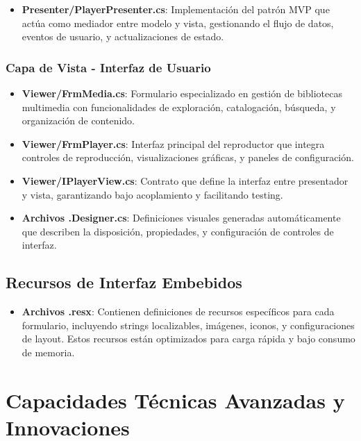 \documentclass[a4paper]{article}
\begin{document}
\begin{itemize}
\item \textbf{Presenter/PlayerPresenter.cs}: Implementación del patrón MVP que actúa como mediador entre modelo y vista, gestionando el flujo de datos, eventos de usuario, y actualizaciones de estado.
\end{itemize}

\subsubsection{Capa de Vista - Interfaz de Usuario}

\begin{itemize}
\item \textbf{Viewer/FrmMedia.cs}: Formulario especializado en gestión de bibliotecas multimedia con funcionalidades de exploración, catalogación, búsqueda, y organización de contenido.

\item \textbf{Viewer/FrmPlayer.cs}: Interfaz principal del reproductor que integra controles de reproducción, visualizaciones gráficas, y paneles de configuración.

\item \textbf{Viewer/IPlayerView.cs}: Contrato que define la interfaz entre presentador y vista, garantizando bajo acoplamiento y facilitando testing.

\item \textbf{Archivos .Designer.cs}: Definiciones visuales generadas automáticamente que describen la disposición, propiedades, y configuración de controles de interfaz.
\end{itemize}

\subsection{Recursos de Interfaz Embebidos}

\begin{itemize}
\item \textbf{Archivos .resx}: Contienen definiciones de recursos específicos para cada formulario, incluyendo strings localizables, imágenes, iconos, y configuraciones de layout. Estos recursos están optimizados para carga rápida y bajo consumo de memoria.
\end{itemize}

\section{Capacidades Técnicas Avanzadas y Innovaciones}
\end{document}
